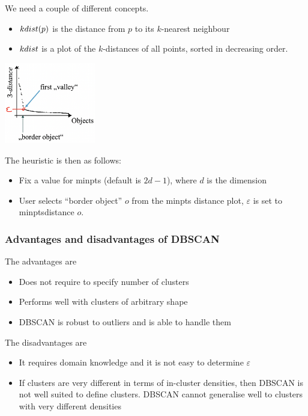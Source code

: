     We need a couple of different concepts. 
    \begin{itemize}
        \item $k\-dist(p)$ is the distance from $p$ to its $k$-nearest neighbour
        \item $k\-dist$ is a plot of the $k$-distances of all points, sorted in decreasing order.
    \end{itemize}
    
    \begin{center}
        \includegraphics[width=0.3\textwidth]{images/valley.png}
    \end{center}
    
    The heuristic is then as follows:
    \begin{itemize}
        \item Fix a value for minpts (default is $2d - 1$), where $d$ is the dimension
        \item User selects ``border object'' $o$ from the minpts distance plot, $\varepsilon$ is set to minpts\-distance $o$.
    \end{itemize}
    
\subsubsection{Advantages and disadvantages of DBSCAN}
    The advantages are 
    \begin{itemize}
        \item Does not require to specify number of clusters
        \item Performs well with clusters of arbitrary shape
        \item DBSCAN is robust to outliers and is able to handle them
    \end{itemize}
    The disadvantages are
    \begin{itemize}
        \item It requires domain knowledge and it is not easy to determine $\varepsilon$
        \item If clusters are very different in terms of in-cluster densities, then DBSCAN is not well suited to define clusters. DBSCAN cannot generalise well to clusters with very different densities
    \end{itemize}
    
